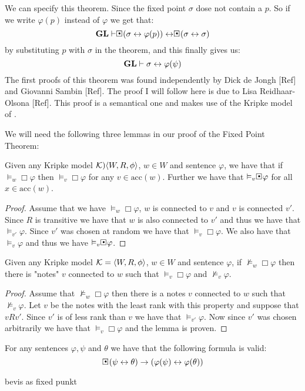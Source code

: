 \documentclass[../main.tex]{subfiles}
\begin{document}
We can specify this theorem. Since the fixed point $\sigma$ dose not contain a
$p$. So if we write $\varphi(p)$ instead of $\varphi$ we get that:
$$\GL\vdash \sBox(\sigma\leftrightarrow \varphi(p))\leftrightarrow\sBox
(\sigma\leftrightarrow\sigma)$$
by substituting $p$ with $\sigma$ in the theorem, and this finally gives us:
$$\text{\textbf{GL}}\vdash\sigma\leftrightarrow\varphi(\psi)$$
The first proofs of this theorem was found independently by Dick de Jongh [Ref] and
Giovanni Sambin [Ref]. The proof I will follow here is due to Lisa
Reidhaar-Olsona [Ref]. This proof is a semantical one and makes use of the
Kripke model of \GL.

We will need the following three lemmas in our proof of the Fixed Point Theorem:
\begin{lem}
	\label{lem:acc}
	Given any Kripke model $\mathcal{K})\langle W,R,\phi\rangle$, $w\in W$ and
	sentence $\varphi$, we have that if $\vDash_w\Box\varphi$ then
	$\vDash_v\Box\varphi$ for any $v\in\text{acc}(w)$. Further we have that
	$\vDash_v\sBox\varphi$ for all $x\in\text{acc}(w)$.
\end{lem}
\begin{proof}
	Assume that we have $\vDash_w\Box\varphi$, $w$ is connected to $v$ and
	$v$ is connected $v'$. Since $R$ is transitive we have that $w$ is also
	connected to $v'$ and thus we have that $\vDash_{v'}\varphi$. Since
	$v'$ was chosen at random we have that $\vDash_v\Box\varphi$. We also
	have that $\vDash_v\varphi$ and thus we have $\vDash_v\sBox\varphi$.
\end{proof}
\begin{lem}
	\label{lem:con}
	Given any Kripke model $\mathcal{K}=\langle W,R,\phi\rangle$, $w\in W$ and
	sentence $\varphi$, if $\not\vDash_w\Box\varphi$ then there is "notes"
	$v$ connected to $w$ such that $\vDash_v\Box\varphi$ and
	$\not\vDash_v\varphi$.
\end{lem}
\begin{proof}
	Assume that $\not\vDash_w\Box\varphi$ then there is a notes $v$
	connected to $w$ such that $\not\vDash_v\varphi$. Let $v$ be the notes
	with the least rank with this property and suppose that $vRv'$. Since
	$v'$ is of less rank than $v$ we have that $\vDash_{v'}\varphi$. Now
	since $v'$ was chosen arbitrarily we have that $\vDash_v\Box\varphi$ and
	the lemma is proven.
\end{proof}
\begin{lem}
	\label{lem:sem}
	For any sentences $\varphi,\psi$ and $\theta$ we have that the
	following formula is valid:
	$$\sBox(\psi\leftrightarrow\theta)\rightarrow(\varphi(\psi)\leftrightarrow\varphi(\theta))$$
\end{lem}
bevis as fixed punkt
\end{document}
